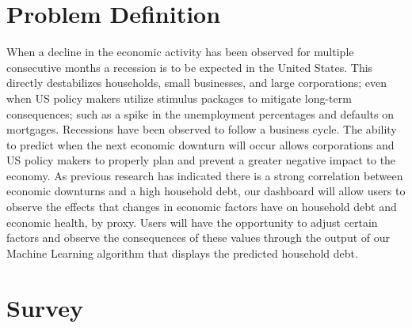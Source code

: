 \documentclass[sigconf,nonacm,11pt]{acmart}
\begin{document}
\section{Problem Definition}

When a decline in the economic activity has been observed for multiple consecutive months a recession is to be expected in the United States. This directly destabilizes households, small businesses, and large corporations; even when US policy makers utilize stimulus packages to mitigate long-term consequences; such as a spike in the unemployment percentages and defaults on mortgages. Recessions have been observed to follow a business cycle. The ability to predict when the next economic downturn will occur allows corporations and US policy makers to properly plan and prevent a greater negative impact to the economy. As previous research has indicated there is a strong correlation between economic downturns and a high household debt, our dashboard will allow users to observe the effects that changes in economic factors have on household debt and economic health, by proxy.  Users will have the opportunity to adjust certain factors and observe the consequences of these values through the output of our Machine Learning algorithm that displays the predicted household debt. \vspace{-1em}

\section{Survey}
\end{document}

